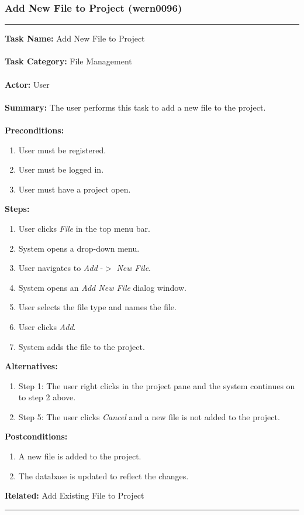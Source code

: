 \documentclass[11pt]{report}
\begin{document}
\subsubsection{Add New File to Project (wern0096)}
\vspace{2pt}
\hrule
\vspace{8pt}
	\noindent\textbf{Task Name:} Add New File to Project \\ \\
	\textbf{Task Category:} File Management \\ \\
	\textbf{Actor:} User \\ \\
	\textbf{Summary:} The user performs this task to add a new file to the project. \\ \\
	\textbf{Preconditions:} 
	\begin{enumerate}
		\item User must be registered.
		\item User must be logged in.
		\item User must have a project open.
	\end{enumerate}
	\textbf{Steps:}
	\begin{enumerate}
		\item User clicks \textit{File} in the top menu bar.
		\item System opens a drop-down menu.
		\item User navigates to \textit{Add} -$>$ \textit{New File}.
		\item System opens an \textit{Add New File} dialog window.
		\item User selects the file type and names the file.
		\item User clicks \textit{Add}.
		\item System adds the file to the project.
	\end{enumerate}
	\textbf{Alternatives:} 
	\begin{enumerate}
		\item Step 1: The user right clicks in the project pane and the system continues on to step 2 above.
		\item Step 5: The user clicks \textit{Cancel} and a new file is not added to the project.
	\end{enumerate}
	\textbf{Postconditions:}
	\begin{enumerate}
		\item A new file is added to the project.
		\item The database is updated to reflect the changes.
	\end{enumerate}
	\textbf{Related:} Add Existing File to Project
\vspace{8pt} 
\hrule
\newpage
\end{document}
